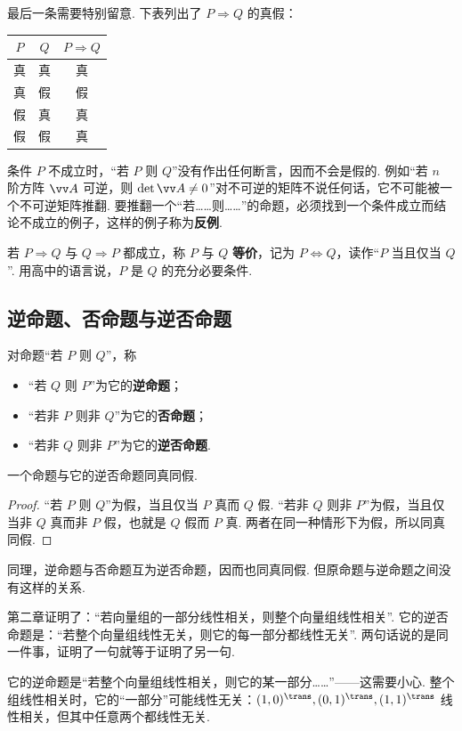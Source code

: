最后一条需要特别留意. 下表列出了 $P\Rightarrow Q$ 的真假：
\begin{center}
	\begin{tabular}{ccc}
		\toprule
		$P$ & $Q$ & $P\Rightarrow Q$ \\
		\midrule
		真 & 真 & 真 \\
		真 & 假 & 假 \\
		假 & 真 & 真 \\
		假 & 假 & 真 \\
		\bottomrule
	\end{tabular}
\end{center}
条件 $P$ 不成立时，“若 $P$ 则 $Q$”没有作出任何断言，因而不会是假的. 例如“若 $n$ 阶方阵 $\vv A$ 可逆，则 $\det\vv A\ne0$”对不可逆的矩阵不说任何话，它不可能被一个不可逆矩阵推翻. 要推翻一个“若……则……”的命题，必须找到一个条件成立而结论不成立的例子，这样的例子称为\textbf{反例}.

若 $P\Rightarrow Q$ 与 $Q\Rightarrow P$ 都成立，称 $P$ 与 $Q$ \textbf{等价}，记为 $P\Leftrightarrow Q$，读作“$P$ 当且仅当 $Q$”. 用高中的语言说，$P$ 是 $Q$ 的充分必要条件.

\subsection{逆命题、否命题与逆否命题}

对命题“若 $P$ 则 $Q$”，称
\begin{itemize}
	\item “若 $Q$ 则 $P$”为它的\textbf{逆命题}；
	\item “若非 $P$ 则非 $Q$”为它的\textbf{否命题}；
	\item “若非 $Q$ 则非 $P$”为它的\textbf{逆否命题}.
\end{itemize}

\begin{theorem}
	一个命题与它的逆否命题同真同假.
\end{theorem}
\begin{proof}
	“若 $P$ 则 $Q$”为假，当且仅当 $P$ 真而 $Q$ 假. “若非 $Q$ 则非 $P$”为假，当且仅当非 $Q$ 真而非 $P$ 假，也就是 $Q$ 假而 $P$ 真. 两者在同一种情形下为假，所以同真同假.
\end{proof}

同理，逆命题与否命题互为逆否命题，因而也同真同假. 但原命题与逆命题之间没有这样的关系.

\begin{example}
	第二章证明了：“若向量组的一部分线性相关，则整个向量组线性相关”. 它的逆否命题是：“若整个向量组线性无关，则它的每一部分都线性无关”. 两句话说的是同一件事，证明了一句就等于证明了另一句.
	
	它的逆命题是“若整个向量组线性相关，则它的某一部分……”——这需要小心. 整个组线性相关时，它的“一部分”可能线性无关：$(1,0)^\trans,(0,1)^\trans,(1,1)^\trans$ 线性相关，但其中任意两个都线性无关.
\end{example}

